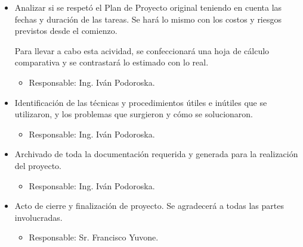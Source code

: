 \documentclass[
11pt, %
codirector, %
]{charter}
\begin{document}
\begin{itemize}
	
	\item Analizar si se respetó el Plan de Proyecto original teniendo en cuenta las fechas y duración de las tareas. Se hará lo mismo con los costos y riesgos previstos desde el comienzo.
	
	Para llevar a cabo esta acividad, se confeccionará una hoja de cálculo comparativa y se contrastará lo estimado con lo real.
	\begin{itemize}
		\item Responsable: Ing. Iván Podoroska.
	\end{itemize}
	
	\item Identificación de las técnicas y procedimientos útiles e inútiles que se utilizaron, y los
problemas que surgieron y cómo se solucionaron.
	\begin{itemize}
		\item Responsable: Ing. Iván Podoroska.
	\end{itemize}
	
	\item Archivado de toda la documentación requerida y generada para la realización del proyecto.
	\begin{itemize}
		\item Responsable: Ing. Iván Podoroska.
	\end{itemize}
	
	\item Acto de cierre y finalización de proyecto. Se agradecerá a todas las partes involucradas.
	\begin{itemize}
		\item Responsable: Sr. Francisco Yuvone.
	\end{itemize}
	
\end{itemize}
\end{document}
